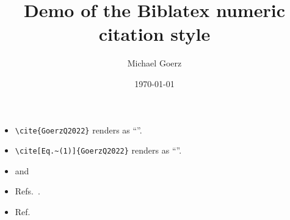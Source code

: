 \documentclass{article}
\def\Author{Michael Goerz}
\def\Title{Demo of the Biblatex numeric citation style}
\begin{document}
\title{\Title}
\author{\Author}
\date{\today}

\maketitle

\begin{itemize}
  \item \verb|\cite{GoerzQ2022}| renders as ``\cite{GoerzQ2022}''.
  \item \verb|\cite[Eq.~(1)]{GoerzQ2022}| renders as ``\cite[Eq.~(1)]{GoerzQ2022}''.
  \item \cite{GoerzPhd2015} and \cite{Luc-KoenigEPJD2004}
  \item Refs.~\cite[and references therein]{WinckelIP2008,BrumerShapiro2003,BrifNJP2010,Shapiro2012,KochJPCM2016,GoerzQ2022,SolaAAMOP2018,MorzhinRMS2019,KochEPJQT2022}.
  \item Ref.~\cite{WP_Schroedinger}
\end{itemize}

\printbibliography
\end{document}
